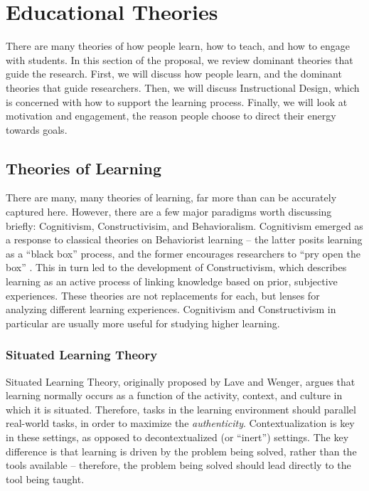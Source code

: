 \section{Educational Theories}

There are many theories of how people learn, how to teach, and how to engage with students. 
In this section of the proposal, we review dominant theories that guide the research.
First, we will discuss how people learn, and the dominant theories that guide researchers.
Then, we will discuss Instructional Design, which is concerned with how to support the learning process.
Finally, we will look at motivation and engagement, the reason people choose to direct their energy towards goals.

\subsection{Theories of Learning}


There are many, many theories of learning, far more than can be accurately captured here.
However, there are a few major paradigms worth discussing briefly: Cognitivism, Constructivisim, and Behavioralism.
Cognitivism emerged as a response to classical theories on Behaviorist learning -- the latter posits learning as a ``black box'' process, and the former encourages researchers to ``pry open the box'' \cite{learningtheories}.
This in turn led to the development of Constructivism, which describes learning as an active process of linking knowledge based on prior, subjective experiences.
These theories are not replacements for each, but lenses for analyzing different learning experiences. Cognitivism and Constructivism in particular are usually more useful for studying higher learning.

\subsubsection{Situated Learning Theory}

Situated Learning Theory, originally proposed by Lave and Wenger, argues that learning normally occurs as a function of the activity, context, and culture in which it is situated\cite{lave-situated}.
Therefore, tasks in the learning environment should parallel real-world tasks, in order to maximize the \textit{authenticity}.
Contextualization is key in these settings, as opposed to decontextualized (or ``inert'') settings.
The key difference is that learning is driven by the problem being solved, rather than the tools available – therefore, the problem being solved should lead directly to the tool being taught.

